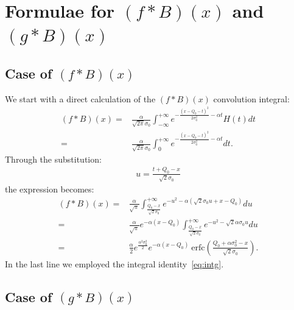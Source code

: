 \documentclass[preprint,12pt]{elsarticle}
\begin{document}
\section{Formulae for $(f*B)(x)$ and $(g*B)(x)$}
\label{app:sr1}
%

\subsection*{Case of $(f*B)(x)$ }
%

We start with a direct calculation of the $(f*B)(x)$ convolution integral:
\begin{align}
(f*B)(x) = & \frac{\alpha}{\sqrt{2\pi}\sigma_0}   \int^{+\infty}_{-\infty} e^{ -\frac{(x-Q_0-t)^2}{2\sigma_0^2} -\alpha t } H(t) dt \nonumber \\
             = & \frac{\alpha}{\sqrt{2\pi}\sigma_0}  \int^{+\infty}_{0} e^{ -\frac{(x-Q_0-t)^2}{2\sigma_0^2} -\alpha t } dt.
\end{align}
Through the substitution:
\begin{align}
u = \frac{t+Q_0-x}{\sqrt{2}\sigma_0}  
\end{align}
the expression becomes:
\begin{align}
(f*B)(x) = & \frac{\alpha }{\sqrt{\pi}}   \int^{+\infty}_{ \frac{Q_0-x}{\sqrt{2}\sigma_0}   } e^{ -u^2 -\alpha( \sqrt{2}\sigma_0 u + x - Q_0 ) } du \nonumber \\
            = & \frac{\alpha }{\sqrt{\pi}} e^{-\alpha(x-Q_0)} \int^{+\infty}_{ \frac{Q_0-x}{\sqrt{2}\sigma_0}   } e^{ -u^2 - \sqrt{2}\alpha\sigma_0 u  } du  \nonumber \\
            = & \frac{\alpha }{2} e^{\frac{\alpha^2\sigma_0^2}{2}} e^{-\alpha(x-Q_0)} \ \text{erfc}\left(    \frac{Q_0 + \alpha\sigma_0^2 -x }{\sqrt{2}\sigma_0} \right).
\end{align}
In the last line we employed the integral identity~\eqref{eq:intg}. 


\subsection*{Case of $(g*B)(x)$ }
%
\end{document}
